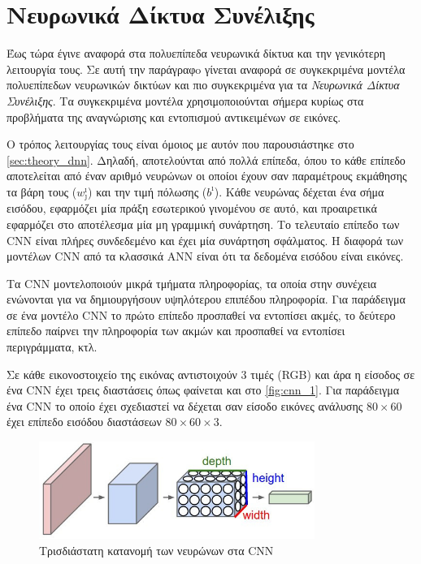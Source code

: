 \section{Νευρωνικά Δίκτυα Συνέλιξης}
\label{sec:theory_cnn}

Έως τώρα έγινε αναφορά στα πολυεπίπεδα νευρωνικά δίκτυα και την γενικότερη
λειτουργία τους. Σε αυτή την παράγραφo γίνεται αναφορά σε συγκεκριμένα μοντέλα
πολυεπίπεδων νευρωνικών δικτύων και πιο συγκεκριμένα για τα
\emph{Νευρωνικά Δίκτυα Συνέλιξης}. Τα συγκεκριμένα μοντέλα χρησιμοποιούνται
σήμερα κυρίως στα προβλήματα της αναγνώρισης και εντοπισμού αντικειμένων
σε εικόνες.

Ο τρόπος λειτουργίας τους είναι όμοιος με αυτόν που παρουσιάστηκε στο %
\autoref{sec:theory_dnn}. Δηλαδή, αποτελούνται από πολλά επίπεδα, όπου το κάθε επίπεδο αποτελείται
από έναν αριθμό νευρώνων οι οποίοι έχουν σαν παραμέτρους εκμάθησης τα βάρη τους ($w_{\jmath}^{\imath}$)
και την τιμή πόλωσης ($b^{\imath}$).
Κάθε νευρώνας δέχεται ένα σήμα εισόδου, εφαρμόζει μία πράξη εσωτερικού γινομένου σε αυτό,
και προαιρετικά εφαρμόζει στο αποτέλεσμα μία μη γραμμική συνάρτηση.
Το τελευταίο επίπεδο των CNN είναι πλήρες συνδεδεμένο και έχει μία
συνάρτηση σφάλματος.
Η διαφορά των μοντέλων CNN από τα κλασσικά ANN είναι ότι τα δεδομένα εισόδου
είναι εικόνες.

Τα CNN μοντελοποιούν μικρά
τμήματα πληροφορίας, τα οποία στην συνέχεια ενώνονται για να δημιουργήσουν
υψηλότερου επιπέδου πληροφορία. Για παράδειγμα σε ένα
μοντέλο CNN το πρώτο επίπεδο προσπαθεί να εντοπίσει ακμές, το δεύτερο
επίπεδο παίρνει την πληροφορία των ακμών και προσπαθεί να εντοπίσει περιγράμματα,
κτλ.

Σε κάθε εικονοστοιχείο της εικόνας αντιστοιχούν 3 τιμές (RGB) και άρα η είσοδος σε ένα
CNN έχει τρεις διαστάσεις όπως φαίνεται και στο \autoref{fig:cnn_1}.
Για παράδειγμα ένα CNN το οποίο έχει σχεδιαστεί να δέχεται σαν είσοδο εικόνες ανάλυσης $80\times60$
έχει επίπεδο εισόδου διαστάσεων $80\times60\times3$.

\begin{figure}[!ht]
  \centering
  \includegraphics[width=0.8\textwidth]{./images/chapter3/cnn.jpg}
  \caption[Τρισδιάστατη κατανομή των νευρώνων στα CNN]{Τρισδιάστατη κατανομή των νευρώνων στα CNN}
  \label{fig:cnn_1}
\end{figure}

